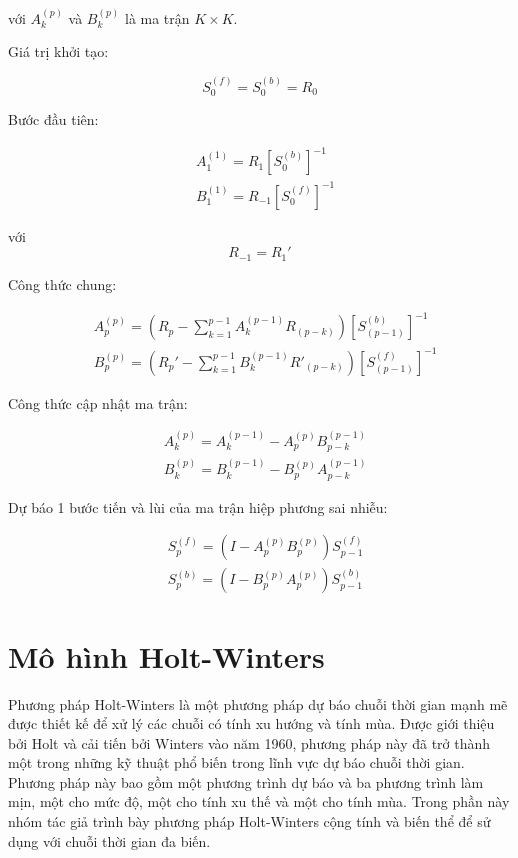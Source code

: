 với $A_k^{(p)}$ và $B_k^{(p)}$ là ma trận $K \times K$. 

Giá trị khởi tạo:

\begin{equation}
    S_0^{(f)} = S_0^{(b)} = R_0
\end{equation}

Bước đầu tiên:

\begin{align}
    & A_1^{(1)} = R_1 \left[ S_0 ^{(b)} \right]^{-1} \\
    & B_1^{(1)} = R_{-1} \left[ S_0 ^{(f)} \right]^{-1}
\end{align}


với 
\[
    R_{-1} = R_1'
\]

Công thức chung:

\begin{align}
    & A_p^{(p)} = (R_p - \sum_{k=1}^{p-1} A_k^{(p-1)} R_{(p-k)} ) \left[ S_{(p-1)}^{(b)}\right]^{-1} \\
    & B_p^{(p)} = (R_p' - \sum_{k=1}^{p-1} B_k^{(p-1)} R'_{(p-k)} ) \left[ S_{(p-1)}^{(f)}\right]^{-1}
\end{align}

Công thức cập nhật ma trận:

\begin{align}
    & A_k^{(p)} = A_k^{(p-1)} - A_p^{(p)} B_{p-k}^{(p-1)} \\
     & B_k^{(p)} = B_k^{(p-1)} - B_p^{(p)} A_{p-k}^{(p-1)}
\end{align}

Dự báo 1 bước tiến và lùi của ma trận hiệp phương sai nhiễu:

\begin{align}
    & S_p^{(f)} = (I - A_p^{(p)} B_p^(p)) S_{p-1} ^{(f)} \\
    & S_p^{(b)} = (I - B_p^{(p)} A_p^(p)) S_{p-1} ^{(b)}
\end{align}

\section{Mô hình Holt-Winters}
    Phương pháp Holt-Winters là một phương pháp dự báo chuỗi thời gian mạnh mẽ được thiết kế để xử lý các chuỗi có tính xu hướng và tính mùa. Được giới thiệu bởi Holt và cải tiến bởi Winters vào năm 1960, phương pháp này đã trở thành một trong những kỹ thuật phổ biến trong lĩnh vực dự báo chuỗi thời gian. Phương pháp này bao gồm một phương trình dự báo và ba phương trình làm mịn, một cho mức độ, một cho tính xu thế và một cho tính mùa. Trong phần này nhóm tác giả trình bày phương pháp Holt-Winters cộng tính và biến thể để sử dụng với chuỗi thời gian đa biến. 

